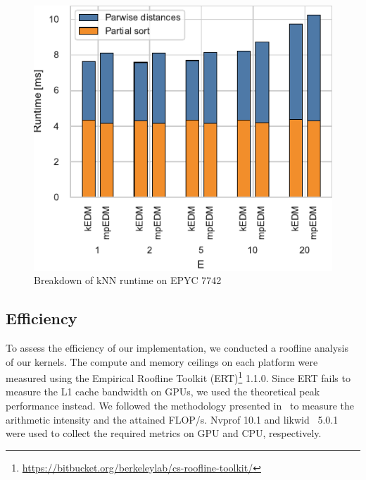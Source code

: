 \documentclass[conference]{IEEEtran}
\begin{document}
\begin{figure}
    \centering
    \includegraphics{figs/breakdown_epyc}
    \caption{Breakdown of kNN runtime on EPYC 7742}%
    \label{fig:architecture}
\end{figure}

\subsection{Efficiency}

To assess the efficiency of our implementation, we conducted a roofline
analysis~\cite{Williams2008} of our kernels. The compute and memory ceilings
on each platform were measured using the Empirical Roofline Toolkit (ERT)\footnote{\url{https://bitbucket.org/berkeleylab/cs-roofline-toolkit/}} 1.1.0.
Since ERT fails to measure the L1 cache bandwidth on GPUs, we used the
theoretical peak performance instead. We followed the methodology presented
in~\cite{Yang2020a,Yang2020b} to measure the arithmetic intensity and the
attained FLOP/s. Nvprof 10.1 and likwid~\cite{Treibig2010} 5.0.1 were used to
collect the required metrics on GPU and CPU, respectively.

\end{document}
